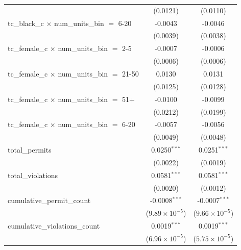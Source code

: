 \begin{tabular}{lcc}
                                                         & (0.0121)                & (0.0110)\\   
   tc\_black\_c $\times$ num\_units\_bin $=$ 6-20        & -0.0043                 & -0.0046\\   
                                                         & (0.0039)                & (0.0038)\\   
   tc\_female\_c $\times$ num\_units\_bin $=$ 2-5        & -0.0007                 & -0.0006\\   
                                                         & (0.0006)                & (0.0006)\\   
   tc\_female\_c $\times$ num\_units\_bin $=$ 21-50      & 0.0130                  & 0.0131\\   
                                                         & (0.0125)                & (0.0128)\\   
   tc\_female\_c $\times$ num\_units\_bin $=$ 51+        & -0.0100                 & -0.0099\\   
                                                         & (0.0212)                & (0.0199)\\   
   tc\_female\_c $\times$ num\_units\_bin $=$ 6-20       & -0.0057                 & -0.0056\\   
                                                         & (0.0049)                & (0.0048)\\   
   total\_permits                                        & 0.0250$^{***}$          & 0.0251$^{***}$\\   
                                                         & (0.0022)                & (0.0019)\\   
   total\_violations                                     & 0.0581$^{***}$          & 0.0581$^{***}$\\   
                                                         & (0.0020)                & (0.0012)\\   
   cumulative\_permit\_count                             & -0.0008$^{***}$         & -0.0007$^{***}$\\   
                                                         & ($9.89\times 10^{-5}$)  & ($9.66\times 10^{-5}$)\\    
   cumulative\_violations\_count                         & 0.0019$^{***}$          & 0.0019$^{***}$\\   
                                                         & ($6.96\times 10^{-5}$)  & ($5.75\times 10^{-5}$)\\    

\end{tabular}
